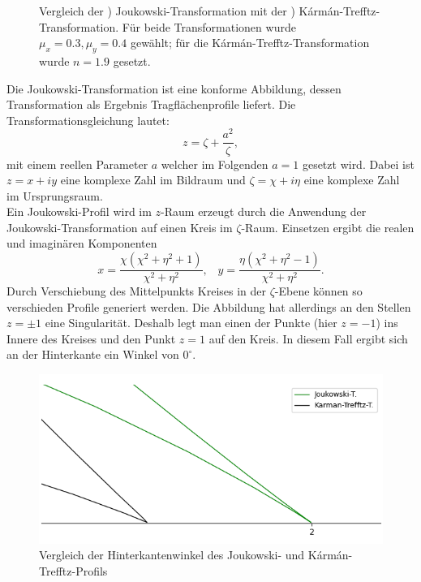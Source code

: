 \begin{figure}[]
\begin{subfigure}[b]{0.5\linewidth}
    \caption{\label{fig:karmantrefftztrans}}
  \end{subfigure}
  \caption{Vergleich der ) Joukowski-Transformation mit der ) Kármán-Trefftz-Transformation. Für beide Transformationen wurde $\mu_x = 0.3, \mu_y =0.4$ gewählt; für die Kármán-Trefftz-Transformation wurde $n=1.9$ gesetzt.\label{fig:joukar}}
\end{figure}
Die Joukowski-Transformation ist eine konforme Abbildung, dessen Transformation als Ergebnis Tragflächenprofile liefert. Die Transformationsgleichung lautet:
\begin{equation}
\label{eq:joukowski}
z = \zeta + \frac{a^2}{\zeta},
\end{equation}
mit einem reellen Parameter $a$ welcher im Folgenden $a=1$ gesetzt wird. Dabei ist $z = x + iy$ eine komplexe Zahl im Bildraum und $\zeta = \chi + i \eta$ eine komplexe Zahl im Ursprungsraum. \\
Ein Joukowski-Profil wird im $z$-Raum erzeugt durch die Anwendung der Joukowski-Transformation auf einen Kreis im $\zeta$-Raum. Einsetzen ergibt die realen und imaginären Komponenten
\begin{equation}
x={\frac {\chi \left(\chi ^{2}+\eta ^{2}+1\right)}{\chi ^{2}+\eta ^{2}}}, \;\;\; y={\frac {\eta \left(\chi ^{2}+\eta ^{2}-1\right)}{\chi ^{2}+\eta ^{2}}}.
\end{equation}
Durch Verschiebung des Mittelpunkts Kreises in der $\zeta$-Ebene können so verschieden Profile generiert werden. Die Abbildung hat allerdings an den Stellen $z = \pm 1$ eine Singularität. Deshalb legt man einen der Punkte (hier $z = -1$) ins Innere des Kreises und den Punkt $z=1$ auf den Kreis. In diesem Fall ergibt sich an der Hinterkante ein Winkel von $0^{\circ}$. \\
\begin{figure}[!ht]
\begin{center} \includegraphics[scale=0.5]{figures/zoomedjouk.png} \end{center}
\caption{Vergleich der Hinterkantenwinkel des Joukowski- und Kármán-Trefftz-Profils}
\label{fig:zoomedjouk}
\end{figure}
